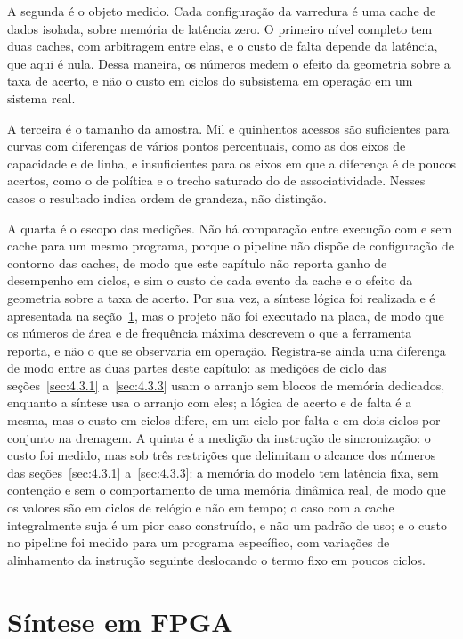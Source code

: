 A segunda é o objeto medido. Cada configuração da varredura é uma cache de dados isolada, sobre memória de latência zero. O primeiro nível completo tem duas caches, com arbitragem entre elas, e o custo de falta depende da latência, que aqui é nula. Dessa maneira, os números medem o efeito da geometria sobre a taxa de acerto, e não o custo em ciclos do subsistema em operação em um sistema real.

A terceira é o tamanho da amostra. Mil e quinhentos acessos são suficientes para curvas com diferenças de vários pontos percentuais, como as dos eixos de capacidade e de linha, e insuficientes para os eixos em que a diferença é de poucos acertos, como o de política e o trecho saturado do de associatividade. Nesses casos o resultado indica ordem de grandeza, não distinção.

A quarta é o escopo das medições. Não há comparação entre execução com e sem cache para um mesmo programa, porque o pipeline não dispõe de configuração de contorno das caches, de modo que este capítulo não reporta ganho de desempenho em ciclos, e sim o custo de cada evento da cache e o efeito da geometria sobre a taxa de acerto. Por sua vez, a síntese lógica foi realizada e é apresentada na seção~\ref{sec:4.8}, mas o projeto não foi executado na placa, de modo que os números de área e de frequência máxima descrevem o que a ferramenta reporta, e não o que se observaria em operação. Registra-se ainda uma diferença de modo entre as duas partes deste capítulo: as medições de ciclo das seções~\ref{sec:4.3.1} a~\ref{sec:4.3.3} usam o arranjo sem blocos de memória dedicados, enquanto a síntese usa o arranjo com eles; a lógica de acerto e de falta é a mesma, mas o custo em ciclos difere, em um ciclo por falta e em dois ciclos por conjunto na drenagem. A quinta é a medição da instrução de sincronização: o custo foi medido, mas sob três restrições que delimitam o alcance dos números das seções~\ref{sec:4.3.1} a~\ref{sec:4.3.3}: a memória do modelo tem latência fixa, sem contenção e sem o comportamento de uma memória dinâmica real, de modo que os valores são em ciclos de relógio e não em tempo; o caso com a cache integralmente suja é um pior caso construído, e não um padrão de uso; e o custo no pipeline foi medido para um programa específico, com variações de alinhamento da instrução seguinte deslocando o termo fixo em poucos ciclos.

\section{Síntese em FPGA}\label{sec:4.8}

